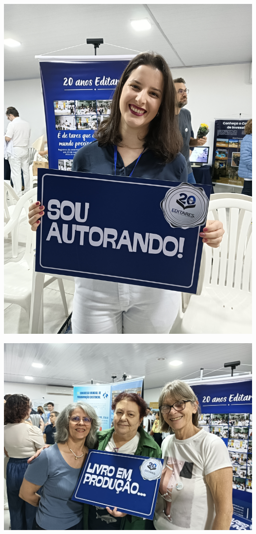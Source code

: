 \documentclass{gescons}
\begin{document}
  \begin{minipage}[b]{0.32\textwidth}
    \includegraphics[width=\linewidth]{articles/resumo/fotos/materia2/IMG20241208144202.jpg}
  \end{minipage}\hfill
  \begin{minipage}[b]{0.55\textwidth}
    \includegraphics[width=\linewidth]{articles/resumo/fotos/materia2/IMG20241208155101.jpg}
  \end{minipage}





        
\end{document}
